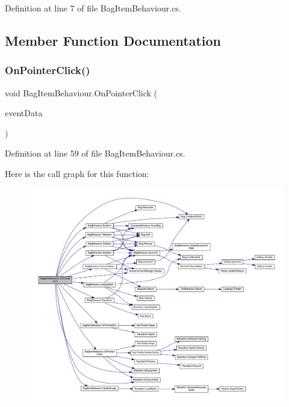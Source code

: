 Definition at line 7 of file Bag\+Item\+Behaviour.\+cs.



\subsection{Member Function Documentation}
\mbox{\label{class_bag_item_behaviour_a81455fb5bdcd5a14ca9440c0f9581708}} 
\subsubsection{\texorpdfstring{OnPointerClick()}{OnPointerClick()}}
{\footnotesize\ttfamily void Bag\+Item\+Behaviour.\+On\+Pointer\+Click (\begin{DoxyParamCaption}\item[{Pointer\+Event\+Data}]{event\+Data }\end{DoxyParamCaption})}



Definition at line 59 of file Bag\+Item\+Behaviour.\+cs.

Here is the call graph for this function\+:
\nopagebreak
\begin{figure}[H]
\begin{center}
\leavevmode
\includegraphics[width=350pt]{class_bag_item_behaviour_a81455fb5bdcd5a14ca9440c0f9581708_cgraph}
\end{center}
\end{figure}
\mbox{\label{class_bag_item_behaviour_a9dd6c0fb07dd87363f0198070a16cff7}} 
